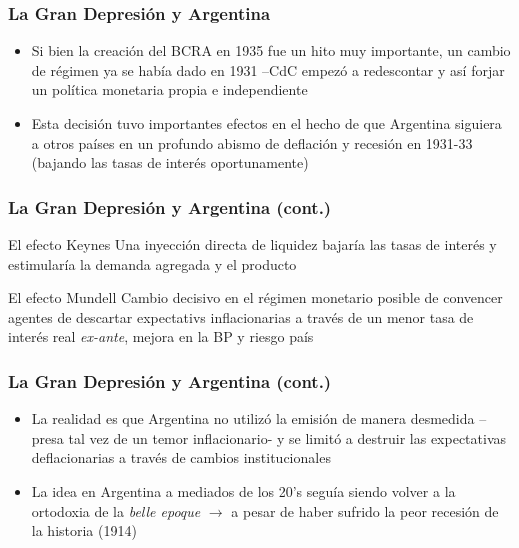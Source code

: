 \documentclass[14pt,aspectratio=169]{beamer}
\begin{document}
\begin{frame}\frametitle{La Gran Depresión y Argentina}
    \begin{itemize}\itemsep 10pt
      \item Si bien la creación del BCRA en 1935 fue un hito muy
        importante, un cambio de régimen ya se había dado en 1931
        --CdC empezó a redescontar y así forjar un política monetaria
        propia e independiente
        \item Esta decisión tuvo importantes efectos en el hecho de
          que Argentina siguiera a otros países en un profundo abismo
          de deflación y recesión en 1931-33 (bajando las tasas de
          interés oportunamente)
                 \end{itemize}
      \end{frame}



      \begin{frame}\frametitle{La Gran Depresión y Argentina (cont.)}
        \begin{block}{El efecto Keynes}
          Una inyección directa de liquidez bajaría las tasas de
          interés y estimularía la demanda agregada y el producto
                   \end{block}
                   \begin{block}{El efecto Mundell}
                       Cambio decisivo en el régimen monetario posible
                       de convencer agentes de descartar expectativs
                       inflacionarias a través de un menor tasa de
                       interés real \textit{ex-ante}, mejora en la BP
                       y riesgo país
                     \end{block}                   
            
      \end{frame}




        \begin{frame}\frametitle{La Gran Depresión y Argentina (cont.)}
          \begin{itemize} \itemsep 15pt
          \item La realidad es que Argentina no utilizó la emisión de
            manera desmedida --presa tal vez de un temor
            inflacionario- y se limitó a destruir las expectativas
            deflacionarias a través de cambios institucionales
            \item La idea en Argentina a mediados de los 20's seguía
              siendo volver a la ortodoxia de la \textit{belle epoque}
              $\longrightarrow$ a pesar de haber sufrido la peor
              recesión de la historia (1914)
            \end{itemize}
      \end{frame}
      
\end{document}
